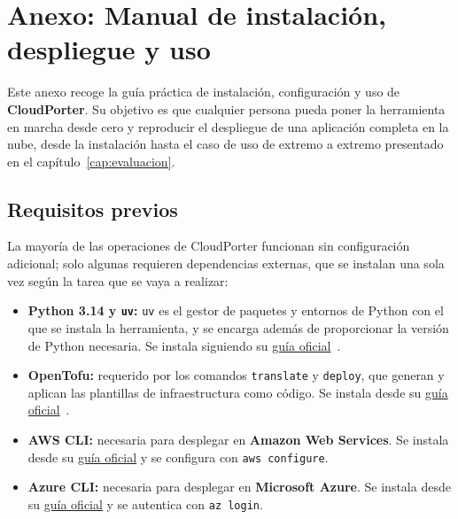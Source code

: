 \chapter*{Anexo: Manual de instalación, despliegue y uso}

Este anexo recoge la guía práctica de instalación, configuración y uso de \textbf{CloudPorter}.
Su objetivo es que cualquier persona pueda poner la herramienta en marcha desde cero y reproducir
el despliegue de una aplicación completa en la nube, desde la instalación hasta el caso de uso de
extremo a extremo presentado en el capítulo~\ref{cap:evaluacion}.

\section*{Requisitos previos}

La mayoría de las operaciones de CloudPorter funcionan sin configuración adicional; solo algunas
requieren dependencias externas, que se instalan una sola vez según la tarea que se vaya a realizar:

\begin{itemize}
    \item \textbf{Python 3.14 y \texttt{uv}:} \texttt{uv} es el gestor de paquetes y entornos de
    Python con el que se instala la herramienta, y se encarga además de proporcionar la versión de
    Python necesaria. Se instala siguiendo su
    \href{https://docs.astral.sh/uv/getting-started/installation/}{guía oficial}~\cite{uvDocs}.
    \item \textbf{OpenTofu:} requerido por los comandos \texttt{translate} y \texttt{deploy}, que
    generan y aplican las plantillas de infraestructura como código. Se instala desde su
    \href{https://opentofu.org/docs/intro/install}{guía oficial}~\cite{opentofuDocs}.
    \item \textbf{AWS CLI:} necesaria para desplegar en \textbf{Amazon Web Services}. Se instala
    desde su \href{https://docs.aws.amazon.com/cli/latest/userguide/install-cliv2.html}{guía
    oficial} y se configura con \texttt{aws configure}.
    \item \textbf{Azure CLI:} necesaria para desplegar en \textbf{Microsoft Azure}. Se instala
    desde su \href{https://learn.microsoft.com/en-us/cli/azure/install-azure-cli}{guía oficial} y
    se autentica con \texttt{az login}.
\end{itemize}

